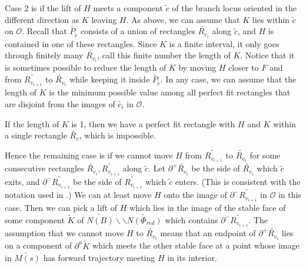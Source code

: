 \documentclass[12pt]{amsart}
\theoremstyle{definition}
\numberwithin{equation}{section}
\begin{document}
Case 2 is if the lift of $H$ meets a component $\widetilde{c}$ of the branch locus oriented in the different direction as $K$ leaving $H$. As above, we can assume that $K$ lies within $\tilde{c}$ on $\mathcal{O}$. Recall that $\widetilde{P_{\widetilde{c}}}$ consists of a union of rectangles $\widetilde{R_{v_i}}$ along $\tilde{c}$, and $H$ is contained in one of these rectangles. Since $K$ is a finite interval, it only goes through finitely many $\widetilde{R_{v_i}}$, call this finite number the length of $K$. Notice that it is sometimes possible to reduce the length of $K$ by moving $H$ closer to $F$ and from $\widetilde{R_{v_{i+1}}}$ to $\widetilde{R_{v_i}}$ while keeping it inside $\widetilde{P_{\widetilde{c}}}$. In any case, we can assume that the length of $K$ is the minimum possible value among all perfect fit rectangles that are disjoint from the images of $\widetilde{c_i}$ in $\mathcal{O}$.

If the length of $K$ is 1, then we have a perfect fit rectangle with $H$ and $K$ within a single rectangle $\widetilde{R_v}$, which is impossible. 

Hence the remaining case is if we cannot move $H$ from $\widetilde{R_{v_{i+1}}}$ to $\widetilde{R_{v_i}}$ for some consecutive rectangles $\widetilde{R_{v_i}}, \widetilde{R_{v_{i+1}}}$ along $\widetilde{c}$. Let $\partial^+ \widetilde{R_{v_i}}$ be the side of $\widetilde{R_{v_i}}$ which $\widetilde{c}$ exits, and $\partial^- \widetilde{R_{v_{i+1}}}$ be the side of $\widetilde{R_{v_{i+1}}}$ which $\widetilde{c}$ enters. (This is consistent with the notation used in .) We can at least move $H$ onto the image of $\partial^- \widetilde{R_{v_{i+1}}}$ in $\mathcal{O}$ in this case. Then we can pick a lift of $H$ which lies in the image of the stable face of some component $\widetilde{K}$ of $\widetilde{N(B)} \backslash \backslash \widetilde{N(\Phi_{red})}$ which contains $\partial^- \widetilde{R_{v_{i+1}}}$. The assumption that we cannot move $H$ to $\widetilde{R_{v_i}}$ means that an endpoint of $\partial^+ \widetilde{R_{v_i}}$ lies on a component of $\partial^u \widetilde{K}$ which meets the other stable face at a point whose image in $\widetilde{M(s)}$ has forward trajectory meeting $H$ in its interior.
\end{document}
